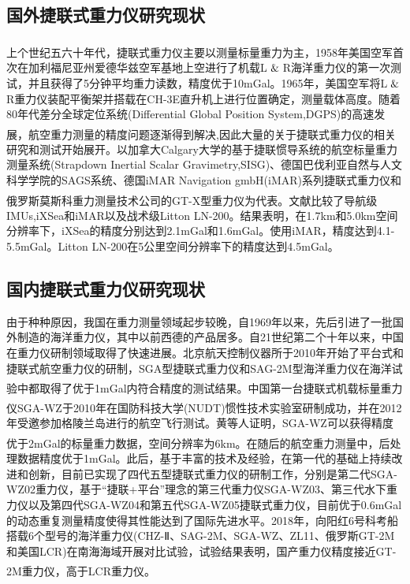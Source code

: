 \documentclass[12pt,a4,utf8]{article}
\newcommand{\upcite}[1]{\textsuperscript{\textsuperscript{\cite{#1}}}} %
\begin{document}
\subsection{国外捷联式重力仪研究现状}
上个世纪五六十年代，捷联式重力仪主要以测量标量重力为主\upcite{peshekhonovstate,thompson1959aerial,thompson1960aerial}，1958年美国空军首次在加利福尼亚州爱德华兹空军基地上空进行了机载L$\And$R海洋重力仪的第一次测试，并且获得了5分钟平均重力读数，精度优于10mGal。1965年，美国空军将L$\And$R重力仪装配平衡架并搭载在CH-3E直升机上进行位置确定，测量载体高度。随着80年代差分全球定位系统(Differential Global Position System,DGPS)的高速发展，航空重力测量的精度问题逐渐得到解决\upcite{thompson1960aerial,brozena1989interferometric,schwarz1989comparison,kleusberg1990airborne},因此大量的关于捷联式重力仪的相关研究和测试开始展开。以加拿大Calgary大学的基于捷联惯导系统的航空标量重力测量系统(Strapdown Inertial Scalar Gravimetry,SISG)、德国巴伐利亚自然与人文科学学院的SAGS系统、德国iMAR Navigation gmbH(iMAR)系列捷联式重力仪和俄罗斯莫斯科重力测量技术公司的GT-X型重力仪为代表\upcite{bruton2000improving,meyer2003angel,bastos2002gravity,boedecker2006sags4,berzhitskii2010airborne,hoss20201}。文献\cite{ayres2015comparison}比较了导航级IMUs,iXSea和iMAR以及战术级Litton LN-200。结果表明，在1.7km和5.0km空间分辨率下，iXSea的精度分别达到2.1mGal和1.6mGal。使用iMAR，精度达到4.1-5.5mGal。Litton LN-200在5公里空间分辨率下的精度达到4.5mGal。
\subsection{国内捷联式重力仪研究现状}
由于种种原因，我国在重力测量领域起步较晚，自1969年以来，先后引进了一批国外制造的海洋重力仪，其中以前西德的产品居多。自21世纪第二个十年以来，中国在重力仪研制领域取得了快速进展。北京航天控制仪器所于2010年开始了平台式和捷联式航空重力仪的研制，SGA型捷联式重力仪和SAG-2M型海洋重力仪在海洋试验中都取得了优于1mGal内符合精度的测试结果\upcite{xiurui}。中国第一台捷联式机载标量重力仪SGA-WZ于2010年在国防科技大学(NUDT)惯性技术实验室研制成功\upcite{DHKZ2020Z1020}，并在2012年受邀参加格陵兰岛进行的航空飞行测试。黄等人证明，SGA-WZ可以获得精度优于2mGal的标量重力数据\upcite{huang2012sga}，空间分辨率为6km。在随后的航空重力测量中，后处理数据精度优于1mGal。此后，基于丰富的技术及经验，在第一代的基础上持续改进和创新，目前已实现了四代五型捷联式重力仪的研制工作，分别是第二代SGA-WZ02重力仪，基于“捷联+平台”理念的第三代重力仪SGA-WZ03、第三代水下重力仪以及第四代SGA-WZ04和第五代SGA-WZ05捷联式重力仪，目前优于0.6mGal的动态重复测量精度使得其性能达到了国际先进水平。2018年，向阳红6号科考船搭载6个型号的海洋重力仪(CHZ-Ⅱ、SAG-2M、SGA-WZ、ZL11、俄罗斯GT-2M和美国LCR)在南海海域开展对比试验，试验结果表明，国产重力仪精度接近GT-2M重力仪，高于LCR重力仪\upcite{yuan2020performance}。
\end{document}
